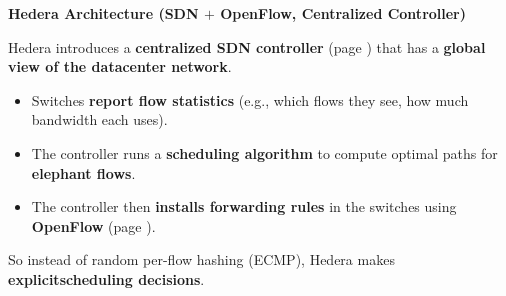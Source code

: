 \highspace
\begin{flushleft}
    \textcolor{Green3}{ \textbf{Hedera Architecture (SDN $+$ OpenFlow, Centralized Controller)}}
\end{flushleft}
Hedera introduces a \textbf{centralized SDN controller} (page \pageref{subsection: SDN Architecture}) that has a \textbf{global view of the datacenter network}.
\begin{itemize}
    \item Switches \textbf{report flow statistics} (e.g., which flows they see, how much bandwidth each uses).
    \item The controller runs a \textbf{scheduling algorithm} to compute optimal paths for \textbf{elephant flows}.
    \item The controller then \textbf{installs forwarding rules} in the switches using \textbf{OpenFlow} (page \pageref{subsection: OpenFlow}).
\end{itemize}
So instead of random per-flow hashing (ECMP), Hedera makes \textbf{explicit\break scheduling decisions}.


